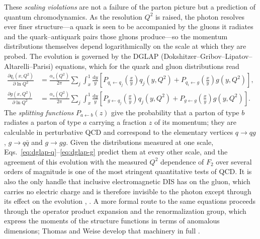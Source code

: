 These \emph{scaling violations} are not a failure of the parton picture but a prediction
of quantum chromodynamics. As the resolution $Q^{2}$ is raised, the photon resolves ever
finer structure---a quark is seen to be accompanied by the gluons it radiates and the
quark--antiquark pairs those gluons produce---so the momentum distributions themselves
depend logarithmically on the scale at which they are probed. The evolution is governed
by the DGLAP (Dokshitzer--Gribov--Lipatov--Altarelli--Parisi) equations, which for the
quark and gluon distributions read
\begin{align}
    \frac{\partial q_{i}(x,Q^{2})}{\partial\ln Q^{2}}
    &= \frac{\alpha_{s}(Q^{2})}{2\pi}\sum_{j}\int_{x}^{1}\frac{\mathrm{d}y}{y}
       \left[P_{q_{i}\leftarrow q_{j}}\!\left(\tfrac{x}{y}\right)q_{j}(y,Q^{2})
       + P_{q_{i}\leftarrow g}\!\left(\tfrac{x}{y}\right)g(y,Q^{2})\right],
    \label{eq:dglap-q}\\[4pt]
    \frac{\partial g(x,Q^{2})}{\partial\ln Q^{2}}
    &= \frac{\alpha_{s}(Q^{2})}{2\pi}\sum_{j}\int_{x}^{1}\frac{\mathrm{d}y}{y}
       \left[P_{g\leftarrow q_{j}}\!\left(\tfrac{x}{y}\right)q_{j}(y,Q^{2})
       + P_{g\leftarrow g}\!\left(\tfrac{x}{y}\right)g(y,Q^{2})\right].
    \label{eq:dglap-g}
\end{align}
The \emph{splitting functions} $P_{a\leftarrow b}(z)$ give the probability that a parton
of type $b$ radiates a parton of type $a$ carrying a fraction $z$ of its momentum; they
are calculable in perturbative QCD and correspond to the elementary vertices
$q\to qg$, $g\to q\bar q$ and $g\to gg$. Given the distributions measured at one scale,
Eqs.~\eqref{eq:dglap-q}--\eqref{eq:dglap-g} predict them at every other scale, and the
agreement of this evolution with the measured $Q^{2}$ dependence of $F_{2}$ over several
orders of magnitude is one of the most stringent quantitative tests of QCD. It is also
the only handle that inclusive electromagnetic DIS has on the gluon, which carries no
electric charge and is therefore invisible to the photon except through its effect on
the evolution \cite[Ch.~1]{Amsler2018}, \cite[Ch.~4.2]{ThomasWeise2001}. A more formal
route to the same equations proceeds through the operator product expansion and the
renormalization group, which express the moments of the structure functions in terms of
anomalous dimensions; Thomas and Weise develop that machinery in full
\cite[Ch.~5]{ThomasWeise2001}.

